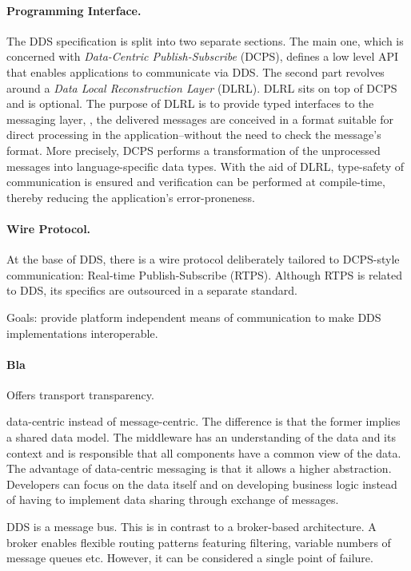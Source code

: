 \paragraph{Programming Interface.}
The DDS specification is split into two separate sections. The main one, which is concerned with \emph{Data-Centric Publish-Subscribe} (DCPS), defines a low level API that enables applications to communicate via DDS. The second part revolves around a \emph{Data Local Reconstruction Layer} (DLRL). DLRL sits on top of DCPS and is optional. The purpose of DLRL is to provide typed interfaces to the messaging layer, \ie , the delivered messages are conceived in a format suitable for direct processing in the application--without the need to check the message's format. More precisely, DCPS performs a transformation of the unprocessed messages into language-specific data types. With the aid of DLRL, type-safety of communication is ensured and verification can be performed at compile-time, thereby reducing the application's error-proneness.


\paragraph{Wire Protocol.}
At the base of DDS, there is a wire protocol deliberately tailored to DCPS-style communication: Real-time Publish-Subscribe (RTPS). Although RTPS is related to DDS, its specifics are outsourced in a separate standard. \cite{rtps-2.2-standard}

Goals: provide platform independent means of communication to make DDS implementations interoperable.



\paragraph{Bla}
Offers transport transparency.

data-centric instead of message-centric. The difference is that the former implies a shared data model. The middleware has an understanding of the data and its context and is responsible that all components have a common view of the data.
The advantage of data-centric messaging is that it allows a higher abstraction. Developers can focus on the data itself and on developing business logic instead of having to implement data sharing through exchange of messages.

DDS is a message bus. This is in contrast to a broker-based architecture. A broker enables flexible routing patterns featuring filtering, variable numbers of message queues etc. However, it can be considered a single point of failure.

